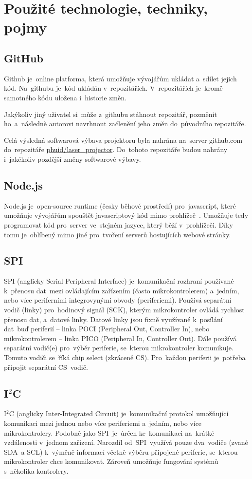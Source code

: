 \chapter{Použité technologie, techniky, pojmy}
\section{GitHub}
Github je~online platforma, která umožňuje vývojářům ukládat a~sdílet jejich kód. Na~githubu je~kód ukládán v~repozitářích. V~repozitářích je~kromě samotného kódu uložena i~historie změn.

Jakýkoliv jiný uživatel si~může z~githubu stáhnout repozitář, pozměnit ho~a~následně autorovi navrhnout začlenění jeho změn do~původního repozitáře.

Celá výsledná softwarová výbava projektoru byla nahrána na~server github.com do~repozitáře \href{https://github.com/phuid/laser_projector}{phuid/laser\_projector}. Do~tohoto repozitáře budou nahrány i~jakékoliv pozdější změny softwarové výbavy.

\section{Node.js}
Node.js je~open-source runtime (česky běhové prostředí) pro~javascript, které umožňuje vývojářům spouštět javascriptový kód mimo prohlížeč~\cite{nodejs-wiki}.
Umožňuje tedy programovat kód pro~server ve~stejném jazyce, který běží v~prohlížeči. Díky tomu je~oblíbený mimo jiné pro~tvoření serverů hostujících webové stránky.

\section{SPI}\label{sec:spi}
SPI (anglicky Serial Peripheral Interface) je~komunikační rozhraní používané k~přenosu dat~mezi ovládajícím zařízením (často mikrokontrolerem) a~jedním, nebo více periferními integrovynými obvody (periferiemi).
Používá separátní vodič (linky) pro~hodinový signál (SCK), kterým mikrokontroler ovládá rychlost přenosu dat, a~datové linky.
Datové linky jsou fixně využívané k~posílání dat~buď periferií -- linka POCI (Peripheral Out, Controller In), nebo mikrokontrolerem -- linka PICO (Peripheral In, Controller Out).
Dále používá separátní vodič(e) pro~výběr periferie, se~kterou mikrokontroler komunikuje. Tomuto vodiči se~říká chip select (zkráceně CS). Pro~každou periferii je~potřeba připojit separátní CS~vodič.~\cite{sparkfun-spi}

\section{I$^{2}$C}
I$^{2}$C (anglicky Inter-Integrated Circuit) je~komunikační protokol umožňující komunikaci mezi jednou nebo více periferiemi a~jedním, nebo více mikrokontrolery.
Podobně jako SPI~je~úrčen ke~komunikaci na~krátké vzdálenosti v~jednom zařízení.
Narozdíl od~SPI~využívá pouze dva~vodiče (zvané SDA~a SCL) k~výměně informací včetně výběru připojené periferie, se~kterou mikrokontroler chce komunikovat.
Zároveň umožňuje fungování systémů s~několika kontrolery.~\cite{sparkfun-i2c}

